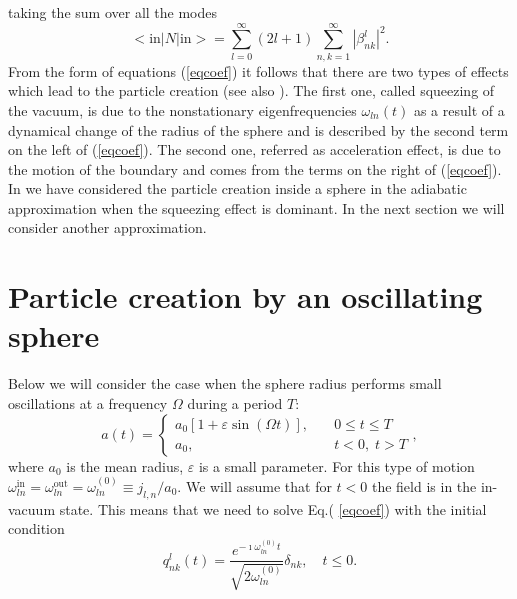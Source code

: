 \documentclass[a4paper,11pt]{article}
\begin{document}
taking the sum over all the modes
\begin{equation}
<{\mathrm{in}}|N|{\mathrm{in}}>=\sum_{l=0}^{\infty }(2l+1)
\sum_{n,k=1}^{\infty
}|\beta _{nk}^{l}|^{2}.  \label{Ntot}
\end{equation}
From the form of equations (\ref{eqcoef}) it follows that there are two
types of effects which lead to the particle creation (see also \cite{Schut}%
). The first one, called squeezing of the vacuum, is due to the
nonstationary eigenfrequencies $\omega _{ln}(t)$ as a result of a dynamical
change of the radius of the sphere and is described by the second term on
the left of (\ref{eqcoef}). The second one, referred as acceleration effect,
is due to the motion of the boundary and comes from the terms on the right
of (\ref{eqcoef}). In \cite{set} we have considered the particle creation
inside a sphere in the adiabatic approximation when the squeezing effect is
dominant. In the next section we will consider another approximation.

\section{Particle creation by an oscillating sphere}

Below we will consider the case when the sphere radius performs small
oscillations at a frequency $\Omega $ during a period $T$:
\begin{equation}
a(t)=\left\{
\begin{array}{cc}
a_{0}[1+\varepsilon \sin (\Omega t)], & \quad 0\leq t\leq T \\
a_{0}, & \quad t<0,\;t>T
\end{array}
\right. ,  \label{radeq}
\end{equation}
where $a_{0}$ is the mean radius, $\varepsilon $ is a small parameter. For
this type of motion $\omega _{ln}^{{\mathrm{in}}}=
\omega _{ln}^{{\mathrm{out}}%
}=\omega _{ln}^{(0)}\equiv j_{l,n}/a_{0}$. We will assume that for $t<0$ the
field is in the in-vacuum state. This means that we need to solve Eq.(%
\ref{eqcoef}) with the initial condition
\begin{equation}
q_{nk}^{l}(t)=\frac{e^{-\imath \omega _{ln}^{(0)}t}}{\sqrt{2\omega
_{ln}^{(0)}}}\delta _{nk},\quad t\leq 0.  \label{initcond}
\end{equation}
\end{document}
